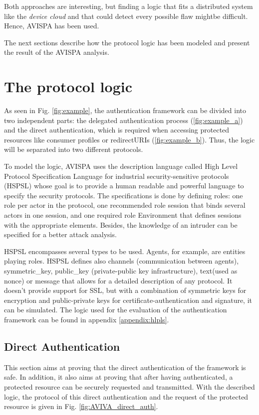 Both approaches are interesting, but finding a logic that fits a distributed system like the \emph{device cloud} and that could detect every possible flaw mightbe difficult. Hence, AVISPA has been used. 

The next sections describe how the protocol logic has been modeled and present the result of the AVISPA analysis.

\section{The protocol logic}
As seen in Fig. \ref{fig:example}, the authentication framework can be divided into two independent parts: the delegated authentication process (\ref{fig:example_a}) and the direct authentication, which is required when accessing protected resources like consumer profiles or redirectURIs (\ref{fig:example_b}). Thus, the logic will be separated into two different protocols.

To model the logic, AVISPA uses the description language called High Level Protocol Specification Language for industrial security-sensitive protocols (HSPSL) whose goal is to provide a human readable and powerful language to specify the security protocols. The specifications is done by defining roles: one role per actor in the protocol, one recommended role session that binds several actors in one session, and one required role Environment that defines sessions with the appropriate elements. Besides, the knowledge of an intruder can be specified for a better attack analysis.

HSPSL encompasses several types to be used. Agents, for example, are entities playing roles. HSPSL defines also channels (communication between agents), symmetric\_key, public\_key (private-public key infrastructure), text(used as nonce) or message that allows for a detailed description of any protocol. It doesn't provide support for SSL, but with a combination of symmetric keys for encryption and public-private keys for certificate-authentication and signature, it can be simulated. The logic used for the evaluation of the authentication framework can be found in appendix \ref{appendix:hlpls}.

\subsection{Direct Authentication}

This section aims at proving that the direct authentication of the framework is safe. In addition, it also aims at proving that after having authenticated, a protected resource can be securely requested and transmitted. With the described logic, the protocol of this direct authentication and the request of the protected resource is given in Fig. \ref{fig:AVIVA_direct_auth}.

